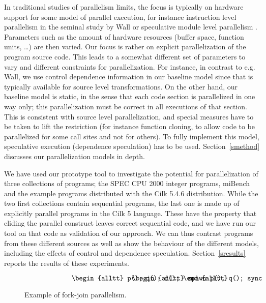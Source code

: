 In traditional studies of parallelism limits, the focus is typically
on hardware support for some model of parallel execution, for instance 
instruction level parallelism in the seminal study by Wall \cite{wall91limits} 
or speculative module level parallelism \cite{warg01limits}. Parameters
such as the amount of hardware resources (buffer space, function
units, \ldots) are then varied. Our focus is rather on explicit
parallelization of the program source code. This leads to a somewhat
different set of parameters to vary and different constraints for
parallelization. For instance, in contrast to e.g. Wall, 
we use control dependence information
in our baseline model since that is typically available for source
level transformations. On the other hand, our baseline model is
static, in the sense that each code section is parallelized in one way
only; this parallelization must be correct in all executions of that
section. This is consistent with source level parallelization, and
special measures have to be taken to lift the restriction (for
instance function cloning, to allow code to be parallelized for some 
call sites and not for others). To fully implement this model, speculative 
execution (dependence speculation) has to be used. Section~\ref{smethod} 
discusses our parallelization models in depth.

We have used our prototype tool to investigate the potential for 
parallelization of three collections of programs; the SPEC CPU 2000 
integer programs, miBench and the example programs distributed with
the Cilk 5.4.6 distribution. While the two first collections contain
sequential programs, the last one is made up of explicitly parallel 
programs in the Cilk 5 language. These have the property that eliding
the parallel construct leaves correct sequential code, and we have run 
our tool on that code as validation of our approach. We can thus contrast 
programs from these different sources as well as show the behaviour of 
the different models, including the effects of control and dependence speculation.
Section~\ref{sresults} reports the results of these experiments.




\begin{figure}
\small
\hrulefill
\[
\begin{minipage}[t]{3cm}
\begin{alltt}
   p();
   q();
   r();
\end{alltt}
\end{minipage}
\begin{minipage}[t]{3cm}
\begin{alltt}
   spawn p();
   q();
   sync;
   r();
\end{alltt}
\end{minipage} 
\]
\hrulefill
\caption{Example of fork-join parallelism.}
\label{fforkjoin}
\end{figure}

